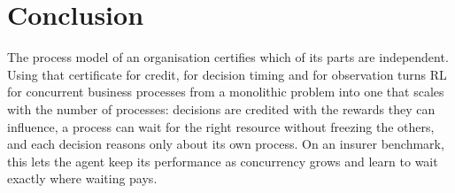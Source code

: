 \section{Conclusion}\label{sec:conclusion}

The process model of an organisation certifies which of its parts are independent. Using
that certificate for credit, for decision timing and for observation turns RL for
concurrent business processes from a monolithic problem into one that scales with the
number of processes: decisions are credited with the rewards they can influence, a
process can wait for the right resource without freezing the others, and each decision
reasons only about its own process. On an insurer benchmark, this lets the agent keep
its performance as concurrency grows and learn to wait exactly where waiting pays.
